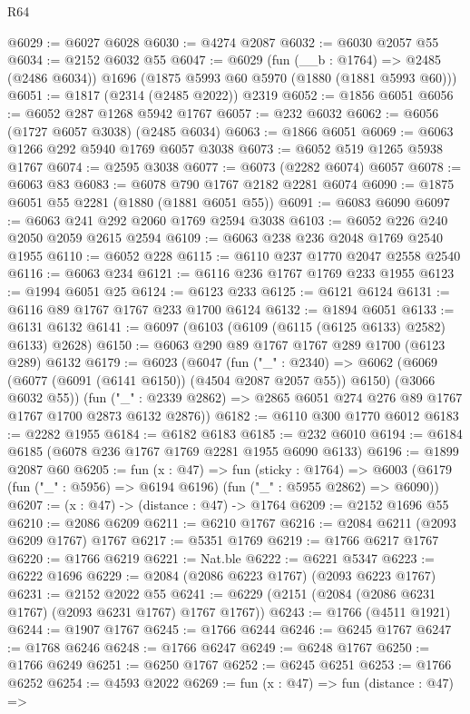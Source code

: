 \begin{lexlean}{R64}
\begin{coremodule}
@6029 := @6027 @6028
@6030 := @4274 @2087
@6032 := @6030 @2057 @55
@6034 := @2152 @6032 @55
@6047 := @6029
    (fun (__b : @1764) => @2485 (@2486 @6034))
    @1696
    (@1875 @5993 @60 @5970 (@1880 (@1881 @5993 @60)))
@6051 := @1817 (@2314 (@2485 @2022)) @2319
@6052 := @1856 @6051
@6056 := @6052 @287 @1268 @5942 @1767
@6057 := @232 @6032
@6062 := @6056 (@1727 @6057 @3038) (@2485 @6034)
@6063 := @1866 @6051
@6069 := @6063 @1266 @292 @5940 @1769 @6057 @3038
@6073 := @6052 @519 @1265 @5938 @1767
@6074 := @2595 @3038
@6077 := @6073 (@2282 @6074) @6057
@6078 := @6063 @83
@6083 := @6078 @790 @1767 @2182 @2281 @6074
@6090 := @1875 @6051 @55 @2281 (@1880 (@1881 @6051 @55))
@6091 := @6083 @6090
@6097 := @6063 @241 @292 @2060 @1769 @2594 @3038
@6103 := @6052 @226 @240 @2050 @2059 @2615 @2594
@6109 := @6063 @238 @236 @2048 @1769 @2540 @1955
@6110 := @6052 @228
@6115 := @6110 @237 @1770 @2047 @2558 @2540
@6116 := @6063 @234
@6121 := @6116 @236 @1767 @1769 @233 @1955
@6123 := @1994 @6051 @25
@6124 := @6123 @233
@6125 := @6121 @6124
@6131 := @6116 @89 @1767 @1767 @233 @1700 @6124
@6132 := @1894 @6051
@6133 := @6131 @6132
@6141 := @6097 (@6103 (@6109 (@6115 (@6125 @6133) @2582) @6133) @2628)
@6150 := @6063 @290 @89 @1767 @1767 @289 @1700 (@6123 @289) @6132
@6179 := @6023
    (@6047
      (fun ("_" : @2340) =>
      @6062 (@6069 (@6077 (@6091 (@6141 @6150)) (@4504 @2087 @2057 @55)) @6150) (@3066 @6032 @55))
      (fun ("_" : @2339 @2862) => @2865 @6051 @274 @276 @89 @1767 @1767 @1700 @2873 @6132 @2876))
@6182 := @6110 @300 @1770 @6012
@6183 := @2282 @1955
@6184 := @6182 @6183
@6185 := @232 @6010
@6194 := @6184 @6185 (@6078 @236 @1767 @1769 @2281 @1955 @6090 @6133)
@6196 := @1899 @2087 @60
@6205 := fun (x : @47) =>
  fun (sticky : @1764) =>
  @6003 (@6179 (fun ("_" : @5956) => @6194 @6196) (fun ("_" : @5955 @2862) => @6090))
@6207 := (x : @47) -> (distance : @47) -> @1764
@6209 := @2152 @1696 @55
@6210 := @2086 @6209
@6211 := @6210 @1767
@6216 := @2084 @6211 (@2093 @6209 @1767) @1767
@6217 := @5351 @1769
@6219 := @1766 @6217 @1767
@6220 := @1766 @6219
@6221 := Nat.ble
@6222 := @6221 @5347
@6223 := @6222 @1696
@6229 := @2084 (@2086 @6223 @1767) (@2093 @6223 @1767)
@6231 := @2152 @2022 @55
@6241 := @6229 (@2151 (@2084 (@2086 @6231 @1767) (@2093 @6231 @1767) @1767 @1767))
@6243 := @1766 (@4511 @1921)
@6244 := @1907 @1767
@6245 := @1766 @6244
@6246 := @6245 @1767
@6247 := @1768 @6246
@6248 := @1766 @6247
@6249 := @6248 @1767
@6250 := @1766 @6249
@6251 := @6250 @1767
@6252 := @6245 @6251
@6253 := @1766 @6252
@6254 := @4593 @2022
@6269 := fun (x : @47) =>
  fun (distance : @47) =>

\end{coremodule}
\end{lexlean}
